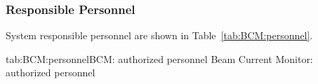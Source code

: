 {\begin{safetyen}{0}{0}
\subsubsection{Responsible Personnel}
System responsible personnel are shown in Table~\ref{tab:BCM:personnel}.
\begin{namestab}{tab:BCM:personnel}{BCM: authorized personnel}{%
   Beam Current Monitor: authorized personnel}
\end{namestab}
\end{safetyen}



}%
